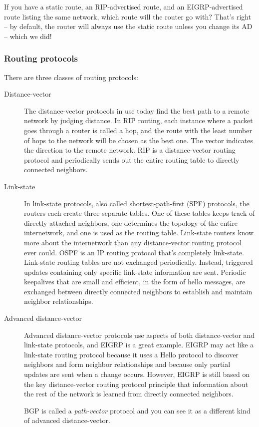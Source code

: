 If you have a static route, an RIP-advertised route, and an EIGRP-advertised route listing the same network,
which route will the router go with? That's right -- by default, the router will always use the static route unless you change its AD -- which we did!


\subsubsection{Routing protocols}

There are three classes of routing protocols:
\begin{description}
\item[Distance-vector]
   The distance-vector protocols in use today find the best path to a remote network by judging distance.
   In RIP routing, each instance where a packet goes through a router is called a hop, and the route with the least number of hops to the network will be chosen as the best one.
   The vector indicates the direction to the remote network.
   RIP is a distance-vector routing protocol and periodically sends out the entire routing table to directly connected neighbors.

\item[Link-state]
   In link-state protocols, also called shortest-path-first (SPF) protocols, the routers each create three separate tables.
   One of these tables keeps track of directly attached neighbors, one determines the topology of the entire internetwork, and one is used as the routing table.
   Link-state routers know more about the internetwork than any distance-vector routing protocol ever could.
   OSPF is an IP routing protocol that's completely link-state.
   Link-state routing tables are not exchanged periodically.
   Instead, triggered updates containing only specific link-state information are sent.
   Periodic keepalives that are small and efficient, in the form of hello messages, are exchanged between directly connected neighbors to establish and maintain neighbor relationships.

\item[Advanced distance-vector]
   Advanced distance-vector protocols use aspects of both distance-vector and link-state protocols, and EIGRP is a great example.
   EIGRP may act like a link-state routing protocol because it uses a Hello protocol to discover neighbors and form neighbor relationships and because only partial updates are sent when a change occurs.
   However, EIGRP is still based on the key distance-vector routing protocol principle that information about the rest of the network is learned from directly connected neighbors.

   BGP is called a \emph{path-vector} protocol and you can see it as a different kind of advanced distance-vector.
\end{description}

